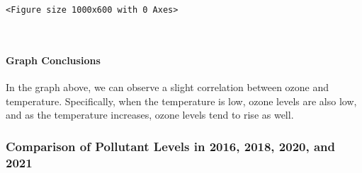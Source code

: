 \documentclass[11pt]{article}
\begin{document}
    
    \begin{Verbatim}[commandchars=\\\{\}]
<Figure size 1000x600 with 0 Axes>
    \end{Verbatim}

    
    \begin{center}
    \end{center}
    { \hspace*{\fill} \\}
    
    \paragraph{Graph Conclusions}\label{graph-conclusions}

In the graph above, we can observe a slight correlation between ozone
and temperature. Specifically, when the temperature is low, ozone levels
are also low, and as the temperature increases, ozone levels tend to
rise as well.

    \subsubsection{Comparison of Pollutant Levels in 2016, 2018, 2020, and
2021}\label{comparison-of-pollutant-levels-in-2016-2018-2020-and-2021}
\end{document}
